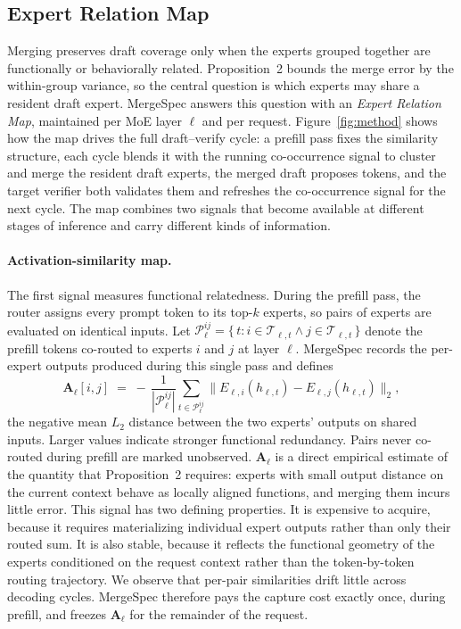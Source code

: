 \subsection{Expert Relation Map}

Merging preserves draft coverage only when the experts grouped together
are functionally or behaviorally related. Proposition~2 bounds the merge
error by the within-group variance, so the central question is which
experts may share a resident draft expert. MergeSpec answers this question
with an \emph{Expert Relation Map}, maintained per MoE layer $\ell$ and
per request. Figure~\ref{fig:method} shows how the map drives the full
draft--verify cycle: a prefill pass fixes the similarity structure, each
cycle blends it with the running co-occurrence signal to cluster and
merge the resident draft experts, the merged draft proposes tokens, and
the target verifier both validates them and refreshes the co-occurrence
signal for the next cycle. The map combines two signals that become
available at different stages of inference and carry different kinds of
information.

\paragraph{Activation-similarity map.}
The first signal measures functional relatedness. During the prefill
pass, the router assigns every prompt token to its top-$k$ experts, so
pairs of experts are evaluated on identical inputs. Let
$\mathcal{P}_{\ell}^{ij} = \{\, t : i \in \mathcal{T}_{\ell,t} \wedge
j \in \mathcal{T}_{\ell,t} \,\}$ denote the prefill tokens co-routed to
experts $i$ and $j$ at layer $\ell$. MergeSpec records the per-expert
outputs produced during this single pass and defines
\begin{equation}
\mathbf{A}_{\ell}[i,j] \;=\;
  -\,\frac{1}{|\mathcal{P}_{\ell}^{ij}|}
  \sum_{t \in \mathcal{P}_{\ell}^{ij}}
  \bigl\lVert E_{\ell,i}(h_{\ell,t}) - E_{\ell,j}(h_{\ell,t})
  \bigr\rVert_{2},
\label{eq:actsim}
\end{equation}
the negative mean $L_2$ distance between the two experts' outputs on
shared inputs. Larger values indicate stronger functional redundancy.
Pairs never co-routed during prefill are marked unobserved.
$\mathbf{A}_{\ell}$ is a direct empirical estimate of the quantity that
Proposition~2 requires: experts with small output distance on the current
context behave as locally aligned functions, and merging them incurs
little error. This signal has two defining properties. It is expensive to
acquire, because it requires materializing individual expert outputs
rather than only their routed sum. It is also stable, because it reflects
the functional geometry of the experts conditioned on the request context
rather than the token-by-token routing trajectory. We observe that
per-pair similarities drift little across decoding cycles. MergeSpec
therefore pays the capture cost exactly once, during prefill, and freezes
$\mathbf{A}_{\ell}$ for the remainder of the request.

